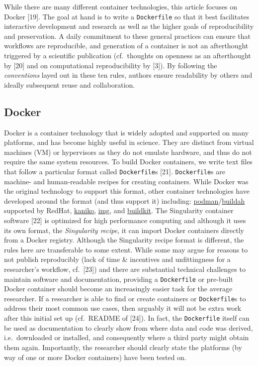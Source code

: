 \documentclass[10pt,letterpaper]{article}
\begin{document}
While there are many different container technologies, this article
focuses on Docker {[}19{]}. The goal at hand is to write a
\texttt{Dockerfile} so that it best facilitates interactive development
and research as well as the higher goals of reproducibility and
preservation. A daily commitment to these general practices can ensure
that workflows are reproducible, and generation of a container is not an
afterthought triggered by a scientific publication (cf.~thoughts on
openness as an afterthought by {[}20{]} and on computational
reproducibility by {[}3{]}). By following the \emph{conventions} layed
out in these ten rules, authors ensure readability by others and ideally
subsequent reuse and collaboration.

\hypertarget{docker}{%
\subsection*{Docker}\label{docker}}

Docker is a container technology that is widely adopted and supported on
many platforms, and has become highly useful in science. They are
distinct from virtual machines (VM) or hypervisors as they do not
emulate hardware, and thus do not require the same system resources. To
build Docker containers, we write text files that follow a particular
format called \texttt{Dockerfile}s {[}21{]}. \texttt{Dockerfile}s are
machine- and human-readable recipes for creating containers. While
Docker was the original technology to support this format, other
container technologies have developed around the format (and thus
support it) including:
\href{https://podman.io/}{podman}/\href{https://github.com/containers/buildah}{buildah}
supported by RedHat,
\href{https://github.com/GoogleContainerTools/kaniko}{kaniko},
\href{https://github.com/genuinetools/img}{img}, and
\href{https://github.com/moby/buildkit}{buildkit}. The Singularity
container software {[}22{]} is optimized for high performance computing
and although it uses its own format, the \emph{Singularity recipe}, it
can import Docker containers directly from a Docker registry. Although
the Singularity recipe format is different, the rules here are
transferable to some extent. While some may argue for reasons to not
publish reproducibly (lack of time \& incentives and unfittingness for a
researcher's workflow, cf.~{[}23{]}) and there are substantial technical
challenges to maintain software and documentation, providing a
\texttt{Dockerfile} or pre-built Docker container should become an
increasingly easier task for the average researcher. If a researcher is
able to find or create containers or \texttt{Dockerfile}s to address
their most common use cases, then arguably it will not be extra work
after this initial set up (cf.~README of {[}24{]}). In fact, the
\texttt{Dockerfile} itself can be used as documentation to clearly show
from where data and code was derived, i.e.~downloaded or installed, and
consequently where a third party might obtain them again. Importantly,
the researcher should clearly state the platforms (by way of one or more
Docker containers) have been tested on.
\end{document}
